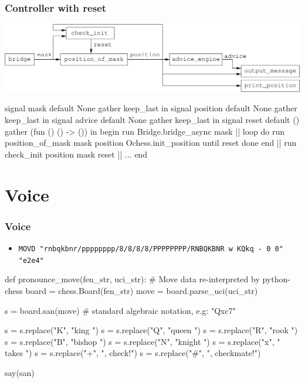 \documentclass[t]{beamer}
\begin{document}
\begin{frame}[fragile]
\frametitle{Controller with reset}

\includegraphics[scale=0.6]{figures/controller-with-reset}

\begin{lstrml}
  signal mask default None gather keep_last in
  signal position default None gather keep_last in
  signal advice default None gather keep_last in
  signal reset default () gather (fun () () -> ()) in
  begin
    run Bridge.bridge_async mask ||
    loop
      do
        run position_of_mask mask position Ochess.init_position
      until reset done
    end ||
    run check_init position mask reset ||
    ...
  end
\end{lstrml}

\end{frame}


\section{Voice}

\begin{frame}[fragile]
\frametitle{Voice}

\begin{itemize}
    \item {\scriptsize \verb.MOVD "rnbqkbnr/pppppppp/8/8/8/8/PPPPPPPP/RNBQKBNR w KQkq - 0 0" "e2e4". }
\end{itemize}

\pause

\begin{lstpython}
def pronounce_move(fen_str, uci_str):
    # Move data re-interpreted by python-chess
    board = chess.Board(fen_str)
    move = board.parse_uci(uci_str)

    s = board.san(move) # standard algebraic notation, e.g: "Qxc7"

    s = s.replace("K", "king ")
    s = s.replace("Q", "queen ")
    s = s.replace("R", "rook ")
    s = s.replace("B", "bishop ")
    s = s.replace("N", "knight ")
    s = s.replace("x", " takes ")
    s = s.replace("+", ", check!")
    s = s.replace("#", ", checkmate!")

    say(san)
\end{lstpython}

\end{frame}
\end{document}
